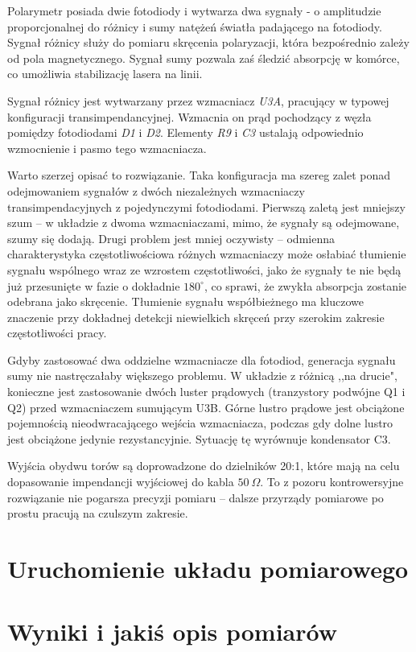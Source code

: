 \documentclass[a4paper,10pt]{article}
\begin{document}
Polarymetr posiada dwie fotodiody i wytwarza dwa sygnały - o amplitudzie proporcjonalnej do różnicy i sumy natężeń światła padającego na fotodiody.
Sygnał różnicy służy do pomiaru skręcenia polaryzacji, która bezpośrednio zależy od pola magnetycznego.  Sygnał sumy pozwala zaś śledzić absorpcję w komórce, co umożliwia stabilizację lasera na linii.

Sygnał różnicy jest wytwarzany przez wzmacniacz \textit{U3A}, pracujący w typowej konfiguracji transimpendancyjnej. Wzmacnia on prąd pochodzący z węzła pomiędzy fotodiodami \textit{D1} i \textit{D2}.
Elementy \textit{R9} i \textit{C3} ustalają odpowiednio wzmocnienie i pasmo tego wzmacniacza.

Warto szerzej opisać to rozwiązanie. Taka konfiguracja ma szereg zalet ponad odejmowaniem sygnałów z dwóch niezależnych wzmacniaczy transimpendacyjnych z pojedynczymi fotodiodami.
Pierwszą zaletą jest mniejszy szum -- w układzie z dwoma wzmacniaczami, mimo, że sygnały są odejmowane, szumy się dodają. Drugi problem jest mniej oczywisty -- odmienna charakterystyka częstotliwościowa różnych wzmacniaczy może osłabiać tłumienie sygnału wspólnego wraz ze wzrostem częstotliwości, jako że sygnały te nie będą już przesunięte w fazie o dokładnie $180^{\circ}$, co sprawi, że zwykła absorpcja zostanie odebrana jako skręcenie. Tłumienie sygnału współbieżnego ma kluczowe znaczenie przy dokładnej detekcji niewielkich skręceń przy szerokim zakresie częstotliwości pracy.

Gdyby zastosować dwa oddzielne wzmacniacze dla fotodiod, generacja sygnału sumy nie nastręczałaby większego problemu. W układzie z różnicą ,,na drucie", konieczne jest zastosowanie dwóch luster prądowych (tranzystory podwójne Q1 i Q2) przed wzmacniaczem sumującym U3B. Górne lustro prądowe jest obciążone pojemnością nieodwracającego wejścia wzmacniacza, podczas gdy dolne lustro jest obciążone jedynie rezystancyjnie. Sytuację tę wyrównuje kondensator C3. 

Wyjścia obydwu torów są doprowadzone do dzielników 20:1, które mają na celu dopasowanie impendancji wyjściowej do kabla $50~\Omega$. To z pozoru kontrowersyjne rozwiązanie nie pogarsza precyzji pomiaru -- dalsze przyrządy pomiarowe po prostu pracują na czulszym zakresie.

\section{Uruchomienie układu pomiarowego}


\section{Wyniki i jakiś opis pomiarów}
\end{document}
